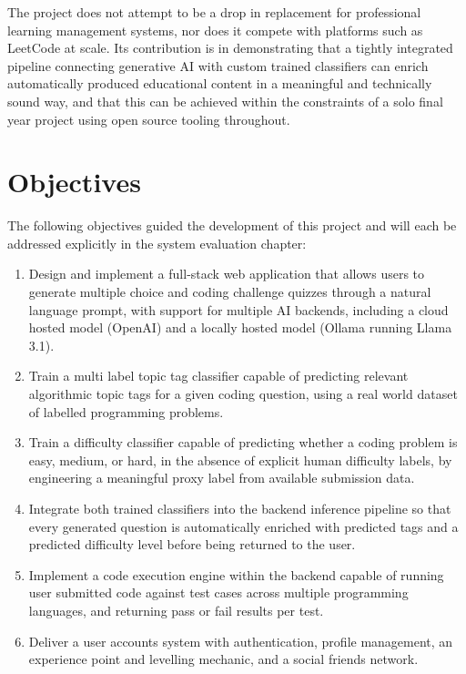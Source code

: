 The project does not attempt to be a drop in replacement for professional
learning management systems, nor does it compete with platforms such as
LeetCode at scale. Its contribution is in demonstrating that a tightly
integrated pipeline connecting generative AI with custom trained classifiers can enrich automatically produced educational content in a meaningful and technically sound way, and that this can be achieved within the constraints of a solo final year project using open source tooling throughout.

\section{Objectives}

The following objectives guided the development of this project and will
each be addressed explicitly in the system evaluation chapter:

\begin{enumerate}
    \item Design and implement a full-stack web application that allows
    users to generate multiple choice and coding challenge quizzes through
    a natural language prompt, with support for multiple AI backends,
    including a cloud hosted model (OpenAI) and a locally hosted model
    (Ollama running Llama 3.1).
    \item Train a multi label topic tag classifier capable of predicting
    relevant algorithmic topic tags for a given coding question, using a
    real world dataset of labelled programming problems.
    \item Train a difficulty classifier capable of predicting whether a
    coding problem is easy, medium, or hard, in the absence of explicit
    human difficulty labels, by engineering a meaningful proxy label from
    available submission data.
    \item Integrate both trained classifiers into the backend inference
    pipeline so that every generated question is automatically enriched
    with predicted tags and a predicted difficulty level before being
    returned to the user.
    \item Implement a code execution engine within the backend capable of
    running user submitted code against test cases across multiple
    programming languages, and returning pass or fail results per test.
    \item Deliver a user accounts system with authentication, profile
    management, an experience point and levelling mechanic, and a social
    friends network.
\end{enumerate}

